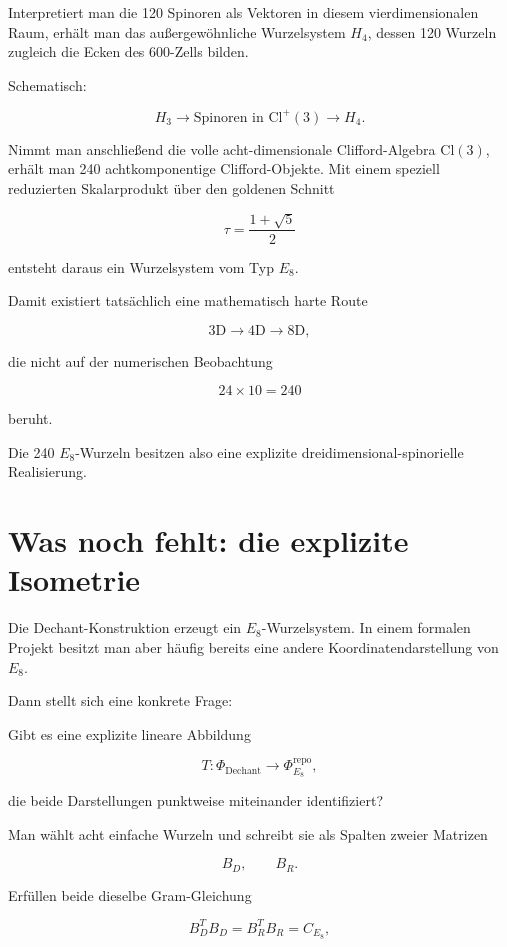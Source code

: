 \documentclass[11pt,a4paper]{article}
\begin{document}
Interpretiert man die 120 Spinoren als Vektoren in diesem vierdimensionalen Raum, erhält man das außergewöhnliche Wurzelsystem \(H_4\), dessen 120 Wurzeln zugleich die Ecken des 600-Zells bilden.


Schematisch:


\[
H_3
\longrightarrow
\text{Spinoren in }\mathrm{Cl}^{+}(3)
\longrightarrow
H_4.
\]


Nimmt man anschließend die volle acht-dimensionale Clifford-Algebra \(\mathrm{Cl}(3)\), erhält man 240 achtkomponentige Clifford-Objekte. Mit einem speziell reduzierten Skalarprodukt über den goldenen Schnitt


\[
\tau=\frac{1+\sqrt{5}}{2}
\]


entsteht daraus ein Wurzelsystem vom Typ \(E_8\).


Damit existiert tatsächlich eine mathematisch harte Route


\[
3\mathrm{D}
\longrightarrow
4\mathrm{D}
\longrightarrow
8\mathrm{D},
\]


die nicht auf der numerischen Beobachtung


\[
24\times10=240
\]


beruht.


Die 240 \(E_8\)-Wurzeln besitzen also eine explizite dreidimensional-spinorielle Realisierung.





\section{Was noch fehlt: die explizite Isometrie}


Die Dechant-Konstruktion erzeugt ein \(E_8\)-Wurzelsystem. In einem formalen Projekt besitzt man aber häufig bereits eine andere Koordinatendarstellung von \(E_8\).


Dann stellt sich eine konkrete Frage:


Gibt es eine explizite lineare Abbildung


\[
T:\Phi_{\mathrm{Dechant}}
\longrightarrow
\Phi_{E_8}^{\mathrm{repo}},
\]


die beide Darstellungen punktweise miteinander identifiziert?


Man wählt acht einfache Wurzeln und schreibt sie als Spalten zweier Matrizen


\[
B_D,\qquad B_R.
\]


Erfüllen beide dieselbe Gram-Gleichung


\[
B_D^TB_D=B_R^TB_R=C_{E_8},
\]
\end{document}
